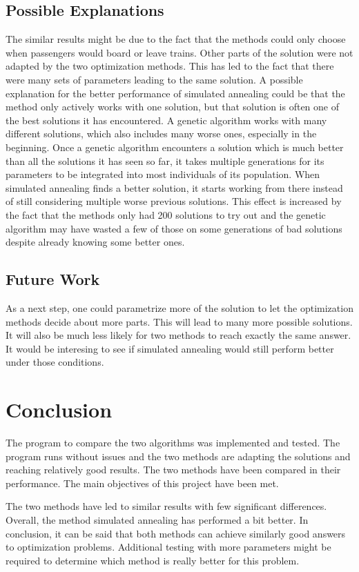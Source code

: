 \documentclass[10pt]{scrreprt}
\begin{document}
\section{Possible Explanations}
The similar results might be due to the fact that the methods could only choose when passengers would board or leave trains. Other parts of the solution were not adapted by the two optimization methods. This has led to the fact that there were many sets of parameters leading to the same solution. A possible explanation for the better performance of simulated annealing could be that the method only actively works with one solution, but that solution is often one of the best solutions it has encountered. A genetic algorithm works with many different solutions, which also includes many worse ones, especially in the beginning. Once a genetic algorithm encounters a solution which is much better than all the solutions it has seen so far, it takes multiple generations for its parameters to be integrated into most individuals of its population. When simulated annealing finds a better solution, it starts working from there instead of still considering multiple worse previous solutions. This effect is increased by the fact that the methods only had 200 solutions to try out and the genetic algorithm may have wasted a few of those on some generations of bad solutions despite already knowing some better ones.

\section{Future Work}
As a next step, one could parametrize more of the solution to let the optimization methods decide about more parts. This will lead to many more possible solutions. It will also be much less likely for two methods to reach exactly the same answer. It would be interesing to see if simulated annealing would still perform better under those conditions.

\chapter{Conclusion}
The program to compare the two algorithms was implemented and tested. The program runs without issues and the two methods are adapting the solutions and reaching relatively good results. The two methods have been compared in their performance. The main objectives of this project have been met.

The two methods have led to similar results with few significant differences. Overall, the method simulated annealing has performed a bit better. In conclusion, it can be said that both methods can achieve similarly good answers to optimization problems. Additional testing with more parameters might be required to determine which method is really better for this problem. 
\end{document}
